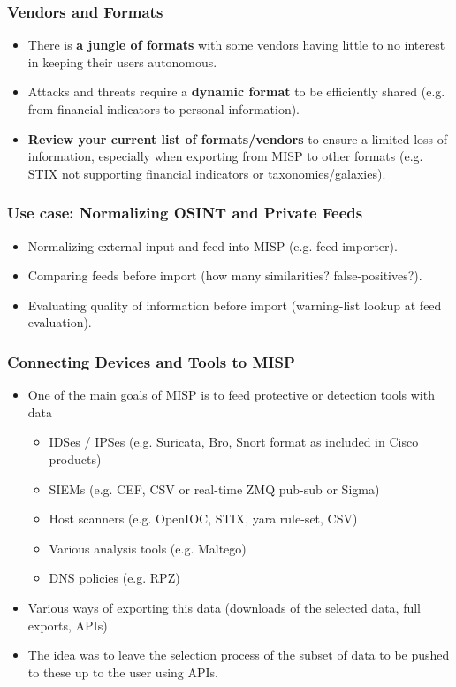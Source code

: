 \begin{frame}
\frametitle{Vendors and Formats}
\begin{itemize}
        \item There is {\bf a jungle of formats} with some vendors having little to no interest in keeping their users autonomous.
        \item Attacks and threats require a {\bf dynamic format} to be efficiently shared (e.g. from financial indicators to personal information).
        \item {\bf Review your current list of formats/vendors} to ensure a limited loss of information, especially when exporting from MISP to other formats (e.g. STIX not supporting financial indicators or taxonomies/galaxies).
\end{itemize}
\end{frame}

\begin{frame}
\frametitle{Use case: Normalizing OSINT and Private Feeds}
\begin{itemize}
        \item Normalizing external input and feed into MISP (e.g. feed importer).
        \item Comparing feeds before import (how many similarities? false-positives?).
        \item Evaluating quality of information before import (warning-list lookup at feed evaluation).
\end{itemize}
\end{frame}


\begin{frame}
\frametitle{Connecting Devices and Tools to MISP}
\begin{itemize}
        \item One of the main goals of MISP is to feed protective or detection tools with data
        \begin{itemize}
            \item IDSes / IPSes (e.g. Suricata, Bro, Snort format as included in Cisco products)
            \item SIEMs (e.g. CEF, CSV or real-time ZMQ pub-sub or Sigma)
            \item Host scanners (e.g. OpenIOC, STIX, yara rule-set, CSV)
            \item Various analysis tools (e.g. Maltego)
            \item DNS policies (e.g. RPZ)
        \end{itemize}
        \item Various ways of exporting this data (downloads of the selected data, full exports, APIs)
        \item The idea was to leave the selection process of the subset of data to be pushed to these up to the user using APIs.
\end{itemize}
\end{frame}


